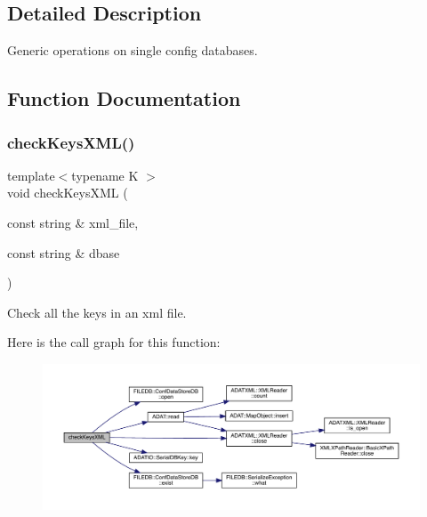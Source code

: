 \subsection{Detailed Description}
Generic operations on single config databases. 



\subsection{Function Documentation}
\mbox{\label{adat-devel_2main_2dbutil_2dbdisco_8cc_a9c4b0a95ff975fd696e640d75b7963cf}} 
\subsubsection{\texorpdfstring{checkKeysXML()}{checkKeysXML()}}
{\footnotesize\ttfamily template$<$typename K $>$ \\
void check\+Keys\+X\+ML (\begin{DoxyParamCaption}\item[{const string \&}]{xml\+\_\+file,  }\item[{const string \&}]{dbase }\end{DoxyParamCaption})}



Check all the keys in an xml file. 

Here is the call graph for this function\+:
\nopagebreak
\begin{figure}[H]
\begin{center}
\leavevmode
\includegraphics[width=350pt]{db/d54/adat-devel_2main_2dbutil_2dbdisco_8cc_a9c4b0a95ff975fd696e640d75b7963cf_cgraph}
\end{center}
\end{figure}
\mbox{\label{adat-devel_2main_2dbutil_2dbdisco_8cc_a57918e290614430413950cb4fdfd967e}} 
